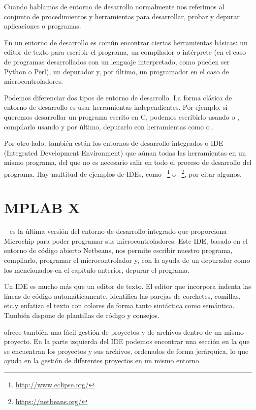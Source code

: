 Cuando hablamos de entorno de desarrollo normalmente nos referimos al conjunto de procedimientos y herramientas para desarrollar, probar y depurar aplicaciones o programas. 

En un entorno de desarrollo es común encontrar ciertas herramientas básicas: un editor de texto para escribir el programa, un compilador o intérprete (en el caso de programas desarrollados con un lenguaje interpretado, como pueden ser Python o Perl), un depurador y, por último, un programador en el caso de microcontroladores.

Podemos diferenciar dos tipos de entorno de desarrollo. La forma clásica de entorno de desarrollo es usar herramientas independientes. Por ejemplo, si queremos desarrollar un programa escrito en C, podemos escribirlo usando  o , compilarlo usando  y por último, depurarlo con herramientas como  o .

Por otro lado, también están los entornos de desarrollo integrados o IDE (Integrated Development Environment) que aúnan todas las herramientas en un mismo programa, del que no es necesario salir en todo el proceso de desarrollo del programa. Hay multitud de ejemplos de IDEs, como ~\footnote{\url{http://www.eclipse.org/}} o ~\footnote{\url{https://netbeans.org/}}, por citar algunos.

\section{MPLAB X} 
~\cite{website:mplab} es la última versión del entorno de desarrollo integrado que proporciona Microchip para poder programar sus microcontroladores. Este IDE, basado en el entorno de código abierto Netbeans, nos permite escribir nuestro programa, compilarlo, programar el microcontrolador y, con la ayuda de un depurador como los mencionados en el capítulo anterior, depurar el programa.

Un IDE es mucho más que un editor de texto. El editor que incorpora  indenta las líneas de código automáticamente, identifica las parejas de corchetes, comillas, etc.\@ y enfatiza el texto con colores de forma tanto sintáctica como semántica. También dispone de plantillas de código y consejos.

 ofrece también una fácil gestión de proyectos y de archivos dentro de un mismo proyecto. En la parte izquierda del IDE podemos encontrar una sección en la que se encuentran los proyectos y sus archivos, ordenados de forma jerárquica, lo que ayuda en la gestión de diferentes proyectos en un mismo entorno.

